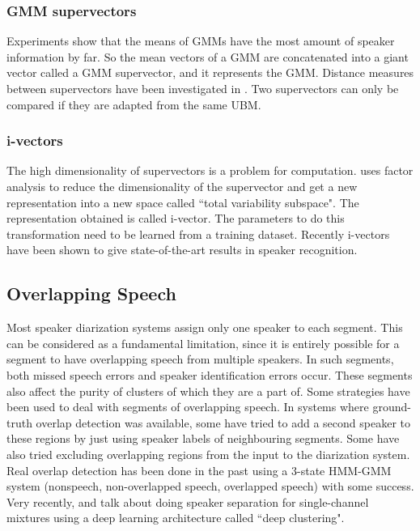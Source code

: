 		\subsubsection{GMM supervectors}
		Experiments show that the means of GMMs have the most amount of speaker information by far. So the mean vectors of a GMM are concatenated into a giant vector called a GMM supervector, and it represents the GMM. Distance measures between supervectors have been investigated in \cite{5545402}. Two supervectors can only be compared if they are adapted from the same UBM.
		
		\subsubsection{i-vectors}
		The high dimensionality of supervectors is a problem for computation. \cite{5545402} uses factor analysis to reduce the dimensionality of the supervector and get a new representation into a new space called ``total variability subspace". The representation obtained is called i-vector. The parameters to do this transformation need to be learned from a training dataset. Recently i-vectors have been shown to give state-of-the-art results in speaker recognition.
				
	\subsection{Overlapping Speech}
	Most speaker diarization systems assign only one speaker to each segment. This can be considered as a fundamental limitation, since it is entirely possible for a segment to have overlapping speech from multiple speakers. In such segments, both missed speech errors and speaker identification errors occur. These segments also affect the purity of clusters of which they are a part of.
	Some strategies have been used to deal with segments of overlapping speech. In systems where ground-truth overlap detection was available, some have tried to add a second speaker to these regions by just using speaker labels of neighbouring segments. Some have also tried excluding overlapping regions from the input to the diarization system. Real overlap detection has been done in the past \cite{trueba2008handling} using a 3-state HMM-GMM system (nonspeech, non-overlapped speech, overlapped speech) with some success. Very recently, \cite{isik2016single} and \cite{hershey2016deep} talk about doing speaker separation for single-channel mixtures using a deep learning architecture called ``deep clustering".
	
